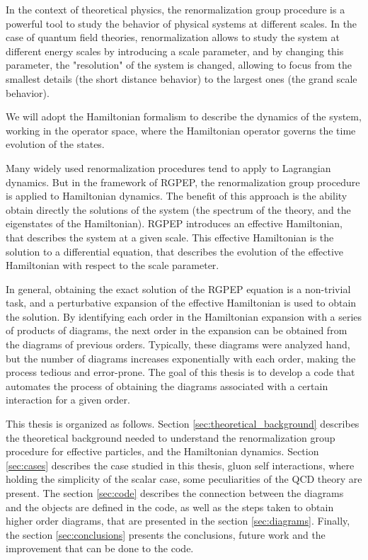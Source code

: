 \documentclass[11pt,a4paper,twoside,pdf]{article}
\numberwithin{equation}{section}
\begin{document}
In the context of theoretical physics, the renormalization group procedure is a 
powerful tool to study the behavior of physical systems at different scales. In
the case of quantum field theories, renormalization allows to study the system
at different energy scales by introducing a scale parameter, and by changing 
this parameter, the "resolution" of the system is changed, allowing to focus from 
the smallest details (the short distance behavior) to the largest ones (the grand 
scale behavior). 

We will adopt the Hamiltonian formalism to describe the dynamics of the system, 
working in the operator space, where the Hamiltonian operator governs the time
evolution of the states. 

Many widely used renormalization procedures tend to apply to Lagrangian dynamics. But 
in the framework of RGPEP, the renormalization group procedure is applied to 
Hamiltonian dynamics. The benefit of this approach is the ability obtain directly 
the solutions of the system (the spectrum of the theory, and the eigenstates of the 
Hamiltonian). RGPEP introduces an effective Hamiltonian, that describes the system at a
given scale. This effective Hamiltonian is the solution to a differential equation,
that describes the evolution of the effective Hamiltonian with respect to the
scale parameter.

In general, obtaining the exact solution of the RGPEP equation is a non-trivial task, 
and a perturbative expansion of the effective Hamiltonian is used to obtain the 
solution. By identifying each order in the Hamiltonian expansion with a series of 
products of diagrams, the next order in the expansion can be obtained from the 
diagrams of previous orders. Typically, these diagrams were analyzed hand, but the 
number of diagrams increases exponentially with each order, making the process 
tedious and error-prone. The goal of this thesis is to develop a code that automates 
the process of obtaining the diagrams associated with a certain interaction for a 
given order.

This thesis is organized as follows. Section \ref{sec:theoretical_background} describes
the theoretical background needed to understand the renormalization group procedure
for effective particles, and the Hamiltonian dynamics. Section \ref{sec:cases}
describes the case studied in this thesis, gluon self interactions, where
holding the simplicity of the scalar case, some peculiarities of the QCD theory are 
present. The section \ref{sec:code} describes the connection between the diagrams 
and the objects are defined in the code, as well as the steps taken to obtain higher 
order diagrams, that are presented in the section \ref{sec:diagrams}. Finally, the 
section \ref{sec:conclusions} presents the conclusions, future work and the 
improvement that can be done to the code.
\end{document}
